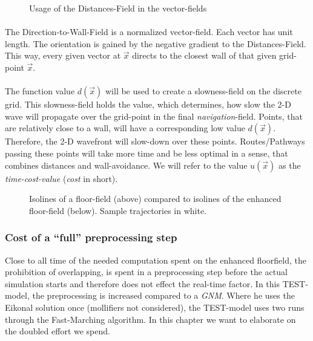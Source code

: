 \begin{figure}[h!]
\begin{center}

\end{center}
\caption{Usage of the Distances-Field in the vector-fields}
\label{sequenceToVFs}
\end{figure}
\paragraph{}
The Direction-to-Wall-Field is a normalized vector-field. Each vector has unit length. The orientation is gained by the negative gradient to the Distances-Field. This way, every given vector at $\vec{x}$ directs to the closest wall of that given grid-point $\vec{x}$.
\paragraph{}
The function value $d(\vec{x})$ will be used to create a slowness-field on the discrete grid. This slowness-field holds the value, which determines, how slow the 2-D wave will propagate over the grid-point in the final \emph{navigation}-field. Points, that are relatively close to a wall, will have a corresponding low value $d(\vec{x})$. Therefore, the 2-D wavefront will slow-down over these points. Routes/Pathways passing these points will take more time and be less optimal in a sense, that combines distances and wall-avoidance. We will refer to the value $u(\vec{x})$ as the \emph{time-cost-value} (\emph{cost} in short).

\begin{figure}[h!]
\caption{Isolines of a floor-field (above) compared to isolines of the enhanced floor-field (below). Sample trajectories in white.}
\label{fig:transformFF}
\end{figure}

\subsubsection{Cost of a ``full'' preprocessing step }

Close to all time of the needed computation spent on the enhanced floorfield, the prohibition of overlapping, is spent in a preprocessing step before the actual simulation starts and therefore does not effect the real-time factor. In this TEST-model, the preprocessing is increased compared to a \emph{GNM}. Where he uses the Eikonal solution once (mollifiers not considered), the TEST-model uses two runs through the Fast-Marching algorithm. In this chapter we want to elaborate on the doubled effort we spend.

